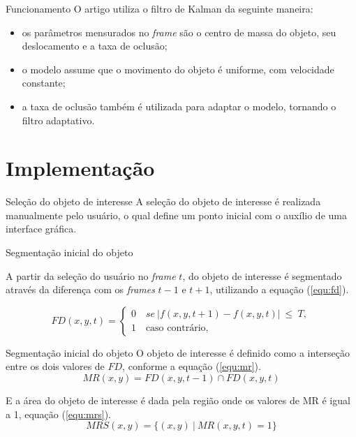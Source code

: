 \documentclass[10pt]{beamer}
\begin{document}
\begin{frame}{Funcionamento}
O artigo utiliza o filtro de Kalman da seguinte maneira:

\begin{itemize}
	\item os parâmetros mensurados no \textit{frame} são o centro de massa do objeto, seu deslocamento e a taxa de oclusão;
	\item o modelo assume que o movimento do objeto é uniforme, com velocidade constante;
	\item a taxa de oclusão também é utilizada para adaptar o modelo, tornando o filtro adaptativo.
\end{itemize}
\end{frame}

\section{Implementação}

\begin{frame}[fragile]{Seleção do objeto de interesse}
	A seleção do objeto de interesse é realizada manualmente pelo usuário, o qual define um ponto inicial com o auxílio de uma interface gráfica.
\end{frame}

\begin{frame}{Segmentação inicial do objeto}

	A partir da seleção do usuário no \textit{frame} $t$,  do objeto de interesse é segmentado através da diferença com os \textit{frames} $t-1$ e $t+1$, utilizando a equação (\ref{equ:fd}).
	
	\begin{equation}
	\label{equ:fd}
	FD(x, y, t) = 
	\begin{cases}
		0 \quad se\ \left| f(x, y, t + 1) - f(x, y, t) \right| \ \le \ T,\\
		1 \quad \text{caso contrário},
	\end{cases}
	\end{equation}

\end{frame}

\begin{frame}{Segmentação inicial do objeto}
	O objeto de interesse é definido como a interseção entre os dois valores de $FD$, conforme a equação (\ref{equ:mr}).
	\begin{equation}
		\label{equ:mr}
		MR(x, y) = FD(x, y, t-1) \cap FD(x, y, t)
	\end{equation}
	
	E a área do objeto de interesse é dada pela região onde os valores de MR é igual a 1, equação (\ref{equ:mrs}).
	\begin{equation}
		\label{equ:mrs}
		MRS(x, y) = \{(x,y) \ | \ MR(x,y,t) = 1\}
	\end{equation}
\end{frame}
\end{document}
